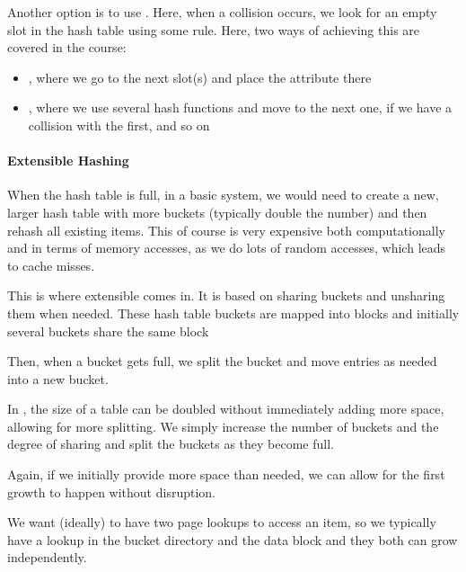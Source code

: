 Another option is to use . Here, when a collision occurs, we look for an empty slot in the hash table using some rule.
Here, two ways of achieving this are covered in the course:
\begin{itemize}
    \item {}, where we go to the next slot(s) and place the attribute there
    \item {}, where we use several hash functions and move to the next one, if we have a collision with the first, and so on
\end{itemize}


\paragraph{Extensible Hashing}
When the hash table is full, in a basic system, we would need to create a new, larger hash table with more buckets (typically double the number) and then rehash all existing items.
This of course is very expensive both computationally and in terms of memory accesses, as we do lots of random accesses, which leads to cache misses.

This is where extensible comes in. It is based on sharing buckets and unsharing them when needed.
These hash table buckets are mapped into blocks and initially several buckets share the same block

Then, when a bucket gets full, we split the bucket and move entries as needed into a new bucket.

In , the size of a table can be doubled without immediately adding more space, allowing for more splitting.
We simply increase the number of buckets and the degree of sharing and split the buckets as they become full.

Again, if we initially provide more space than needed, we can allow for the first growth to happen without disruption.

We want (ideally) to have two page lookups to access an item, so we typically have a lookup in the bucket directory and the data block and they both can grow independently.
